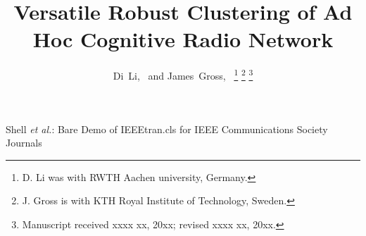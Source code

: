 \documentclass[10pt,journal,compsoc]{IEEEtran}
\theoremstyle{mytheoremstyle}
\theoremstyle{mytheoremstyle}
\theoremstyle{mytheoremstyle}
\begin{document}
%
\title{Versatile Robust Clustering of Ad Hoc Cognitive Radio Network}
%
%
%

\author{Di~Li,~
        and James~Gross,~%
\thanks{D. Li was with RWTH Aachen university, Germany.}%
\thanks{J. Gross is with KTH Royal Institute of Technology, Sweden.}%
\thanks{Manuscript received xxxx xx, 20xx; revised xxxx xx, 20xx.}}

% 
%



%
{Shell \MakeLowercase{\textit{et al.}}: Bare Demo of IEEEtran.cls for IEEE Communications Society Journals}
% 
\end{document}
